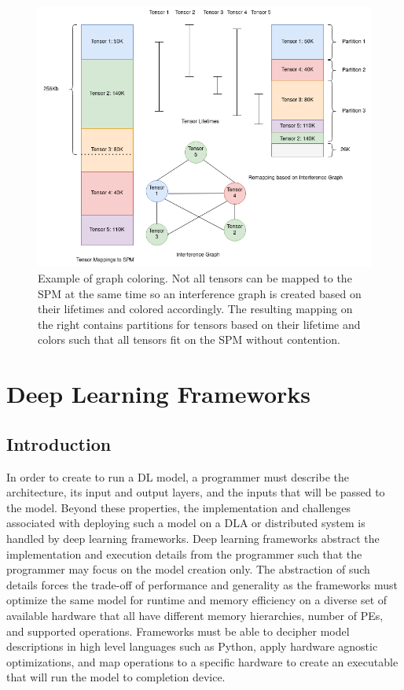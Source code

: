 \begin{figure}[th]
\centering
\includegraphics[scale=0.5]{Figures/graph_coloring_example.png}
\decoRule
\caption[graphColoring]{Example of graph coloring. Not all tensors can be
mapped to the SPM at the same time so an interference graph is created
based on their lifetimes and colored accordingly. The resulting mapping on the 
right contains partitions for tensors based on their lifetime and colors such that
all tensors fit on the SPM without contention.}
\label{fig:graph_color}
\end{figure}

\section{Deep Learning Frameworks}
\subsection{Introduction}
In order to create to run a DL model, a programmer must describe the
architecture, its input and output layers, and the inputs that will be passed
to the model. Beyond these properties, the implementation and challenges
associated with deploying such a model on a DLA or distributed system is
handled by deep learning frameworks. Deep learning frameworks abstract the
implementation and execution details from the programmer such that the
programmer may focus on the model creation only. The abstraction of such
details forces the trade-off of performance and generality as the frameworks
must optimize the same model for runtime and memory efficiency on a diverse set
of available hardware that all have different memory hierarchies, number of PEs,
and supported operations. Frameworks must be able to decipher model
descriptions in high level languages such as Python, apply hardware agnostic
optimizations, and map operations to a specific hardware to create an executable
that will run the model to completion device.

